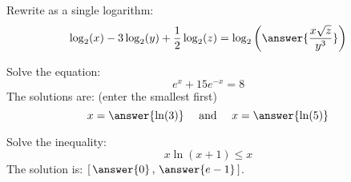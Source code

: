 \documentclass{ximera}
\author{Bobby Ramsey}
\begin{document}
\begin{exercise}
	Rewrite as a single logarithm:
	\[ \log_2 (x) - 3 \log_2(y) + \frac{1}{2} \log_2(z) = \log_2 \left( \answer{\frac{x \sqrt{z}}{y^3}}\right) \]
\end{exercise}

\begin{exercise}
	Solve the equation:
	\[ e^x + 15 e^{-x} = 8 \]
	The solutions are: (enter the smallest first)
	\[ x = \answer{\ln(3)} \quad \text{ and } \quad x = \answer{\ln(5)} \]
\end{exercise}

\begin{exercise}
	Solve the inequality:
	\[ x \ln(x+1) \leq x \]
	The solution is: $\left[ \, \answer{0} \, , \, \answer{e-1} \, \right]$.
	
\end{exercise}
\end{document}
